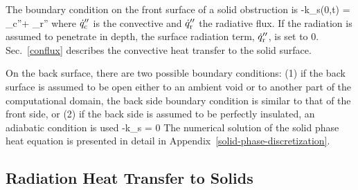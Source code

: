 The boundary condition on the front surface of a solid obstruction is
\be
 -k_{\rm s}(0,t) = _{\rm c}''+ _{\rm r}''
\ee
where $\dot{q}_{\rm c}''$ is the convective and $\dot{q}_{\rm r}''$ the radiative flux. If the radiation is assumed to penetrate in depth, the surface radiation term, $\dot{q}_{\rm r}''$, is set to 0. Sec.~\ref{conflux} describes the convective heat transfer to the solid surface.

On the back surface, there are two possible boundary conditions: (1) if the back surface is assumed to be open either to an ambient void or to another part of the computational domain, the back side boundary condition is similar to that of the front side, or (2) if the back side is assumed to be perfectly insulated, an adiabatic condition is used
\be
 -k_{\rm s} = 0
\ee
The numerical solution of the solid phase heat equation is presented in detail in Appendix~\ref{solid-phase-discretization}.

\subsection{Radiation Heat Transfer to Solids}
\label{inradsection}

